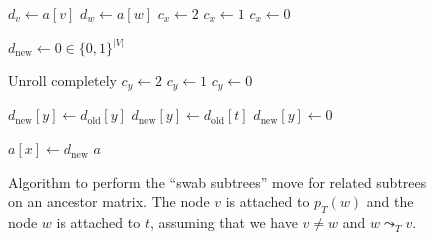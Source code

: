 \begin{figure}[p]
    \begin{algorithmic}[1]
        \State $d_v \leftarrow a[v]$
        \State $d_w \leftarrow a[w]$
                \State $c_x \leftarrow 2$
                \State $c_x \leftarrow 1$
            \Else
                \State $c_x \leftarrow 0$
            \EndIf

            \State $d_\mathrm{new} \leftarrow 0 \in \{0,1\}^{|V|}$

             \Comment Unroll completely
                    \State $c_y \leftarrow 2$
                    \State $c_y \leftarrow 1$
                \Else
                    \State $c_y \leftarrow 0$
                \EndIf

                    \State $d_\mathrm{new}[y] \leftarrow d_\mathrm{old}[y]$
                    \State $d_\mathrm{new}[y] \leftarrow d_\mathrm{old}[t]$
                \Else
                    \State $d_\mathrm{new}[y] \leftarrow 0$
                \EndIf
            \EndFor

            \State $a[x] \leftarrow d_\mathrm{new}$
        \EndFor
        \State \Return $a$
        \EndFunction
    \end{algorithmic}
    \caption{Algorithm to perform the ``swab subtrees'' move for related subtrees on an ancestor matrix. The node $v$ is attached to $p_T(w)$ and the node $w$ is attached to $t$, assuming that we have $v \neq w$ and $w \leadsto_T v$.}
    \label{alg:am_swap_related}
\end{figure}

